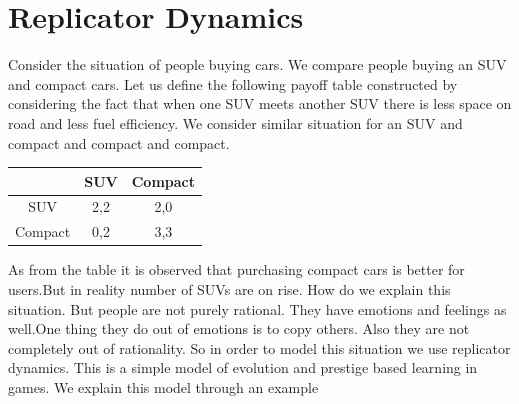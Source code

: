 \documentclass[letterpaper,english,10pt]{article}
\begin{document}
\section{Replicator Dynamics}
Consider the situation of people buying cars. We compare people buying an SUV and compact cars. Let us define the following payoff table constructed by considering the fact that when one SUV meets another SUV there is less space on road and less fuel efficiency. We consider  similar situation for an SUV and compact and compact and compact.

\begin{table}[ht]
\begin{center}
\begin{tabular}{|c|c|c|}
\hline
                   & SUV           & Compact        \\ \hline
SUV                 & 2,2       & 2,0      \\ \hline
Compact                  & 0,2         & 3,3      \\ \hline
\end{tabular}
\end{center}
\end{table}
As from the table it is observed that purchasing compact cars is better for users.But in reality number of SUVs are on rise. How do we explain this situation. But people are not purely rational. They have emotions and feelings as well.One thing they do out of emotions is to copy others. Also they are not completely out of rationality. So in  order to model this situation we use replicator dynamics.
This is a simple model of evolution and prestige based learning in games. We explain this model through an example\\ 
\end{document}
